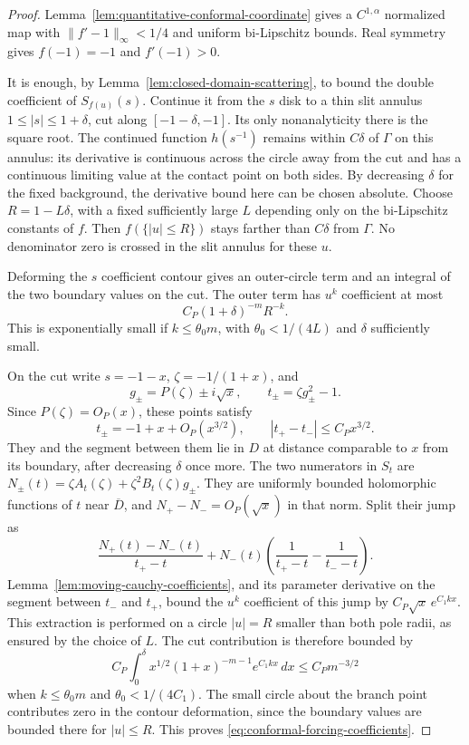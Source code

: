 \documentclass[11pt]{article}
\begin{document}
\begin{proof}
Lemma~\ref{lem:quantitative-conformal-coordinate} gives a
$C^{1,\alpha}$ normalized map with $\|f'-1\|_\infty<1/4$ and
uniform bi-Lipschitz bounds. Real symmetry gives $f(-1)=-1$ and
$f'(-1)>0$.

It is enough, by Lemma~\ref{lem:closed-domain-scattering}, to bound
the double coefficient of $S_{f(u)}(s)$. Continue it from the $s$ disk
to a thin slit annulus $1\le|s|\le1+\delta$, cut along
$[-1-\delta,-1]$. Its only nonanalyticity there is the square root.
The continued function $h(s^{-1})$ remains within $C\delta$ of
$\Gamma$ on this annulus: its derivative is continuous across the
circle away from the cut and has a continuous limiting value at the
contact point on both sides. By decreasing $\delta$ for the fixed
background, the derivative bound here can be chosen absolute.
Choose $R=1-L\delta$, with a fixed sufficiently large $L$ depending
only on the bi-Lipschitz constants of $f$. Then $f(\{|u|\le R\})$
stays farther than $C\delta$ from $\Gamma$. No denominator zero
is crossed in the slit annulus for these $u$.

Deforming the $s$ coefficient contour gives an outer-circle term
and an integral of the two boundary values on the cut. The outer
term has $u^k$ coefficient at most
\[
 C_P(1+\delta)^{-m}R^{-k}.
\]
This is exponentially small if $k\le\theta_0m$, with
$\theta_0<1/(4L)$ and $\delta$ sufficiently small.

On the cut write $s=-1-x$, $\zeta=-1/(1+x)$, and
\[
 g_\pm=P(\zeta)\pm i\sqrt x,\qquad
 t_\pm=\zeta g_\pm^2-1.
\]
Since $P(\zeta)=O_P(x)$, these points satisfy
\[
 t_\pm=-1+x+O_P(x^{3/2}),\qquad
 |t_+-t_-|\le C_Px^{3/2}.
\]
They and the segment between them lie in $D$ at distance comparable
to $x$ from its boundary, after decreasing $\delta$ once more.
The two numerators in $S_t$ are
$N_\pm(t)=\zeta A_t(\zeta)+\zeta^2B_t(\zeta)g_\pm$.
They are uniformly bounded holomorphic functions of $t$ near
$\overline D$, and $N_+-N_-=O_P(\sqrt x)$ in that norm.
Split their jump as
\[
 \frac{N_+(t)-N_-(t)}{t_+-t}
 +N_-(t)\left(\frac1{t_+-t}-\frac1{t_--t}\right).
\]
Lemma~\ref{lem:moving-cauchy-coefficients}, and its parameter
derivative on the segment between $t_-$ and $t_+$, bound the
$u^k$ coefficient of this jump by
$C_P\sqrt x\,e^{C_1kx}$. This extraction is performed on a circle
$|u|=R$ smaller than both pole radii, as ensured by the choice of $L$.
The cut contribution is therefore bounded by
\[
 C_P\int_0^\delta x^{1/2}(1+x)^{-m-1}e^{C_1kx}\,dx
 \le C_Pm^{-3/2}
\]
when $k\le\theta_0m$ and $\theta_0<1/(4C_1)$.
The small circle about the branch point contributes zero in the
contour deformation, since the boundary values are bounded there
for $|u|\le R$. This proves \eqref{eq:conformal-forcing-coefficients}.


\end{proof}
\end{document}
